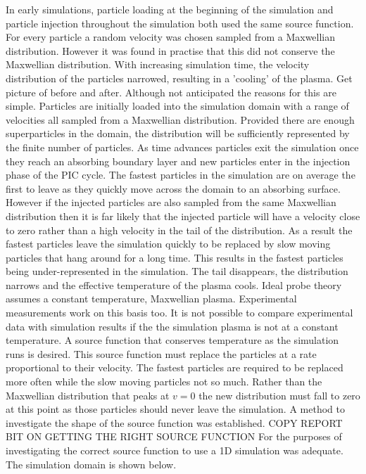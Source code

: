 In early simulations, particle loading at the beginning of the simulation and particle injection throughout the simulation both used the same source function. For every particle a random velocity was chosen sampled from a Maxwellian distribution. However it was found in practise that this did not conserve the Maxwellian distribution. With increasing simulation time, the velocity distribution of the particles narrowed, resulting in a 'cooling' of the plasma. Get picture of before and after. Although not anticipated the reasons for this are simple. Particles are initially loaded into the simulation domain with a range of velocities all sampled from a Maxwellian distribution. Provided there are enough superparticles in the domain, the distribution will be sufficiently represented by the finite number of particles. As time advances particles exit the simulation once they reach an absorbing boundary layer and new particles enter in the injection phase of the PIC cycle. The fastest particles in the simulation are on average the first to leave as they quickly move across the domain to an absorbing surface. However if the injected particles are also sampled from the same Maxwellian distribution then it is far likely that the injected particle will have a velocity close to zero rather than a high velocity in the tail of the distribution. As a result the fastest particles leave the simulation quickly to be replaced by slow moving particles that hang around for a long time. This results in the fastest particles being under-represented in the simulation. The tail disappears, the distribution narrows and the effective temperature of the plasma cools. Ideal probe theory assumes a constant temperature, Maxwellian plasma. Experimental measurements work on this basis too. It is not possible to compare experimental data with simulation results if the the simulation plasma is not at a constant temperature. A source function that conserves temperature as the simulation runs is desired. This source function must replace the particles at a rate proportional to their velocity. The fastest particles are required to be replaced more often while the slow moving particles not so much. Rather than the Maxwellian distribution that peaks at $v=0$ the new distribution must fall to zero at this point as those particles should never leave the simulation. A method to investigate the shape of the source function was established.
COPY REPORT BIT ON GETTING THE RIGHT SOURCE FUNCTION 
For the purposes of investigating the correct source function to use a 1D simulation was adequate. The simulation domain is shown below.
